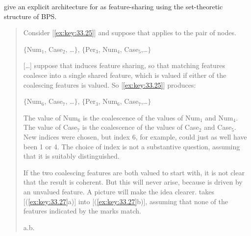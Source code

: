 \documentclass[output=paper]{langsci/langscibook}
\begin{document}
\cite{frampton2000agreement} give an explicit architecture for  as
feature-sharing using the set-theoretic structure of \gls{BPS}.

\blockquote[{\citealt{frampton2000agreement}}]{Consider [\eqref{ex:key:33.25}]
    and suppose that  applies to the pair of nodes.

{\small
\ea\label{ex:key:33.25}$\{$Num${}_1$, Case${}_2$, \ldots$\}$,
$\{$Per${}_3$, Num${}_4$, Case${}_5$,\dots$\}$
\z}

[\ldots] suppose that  induces feature sharing, so that matching features
coalesce into a single shared feature, which is valued if either of the
coalescing features is valued. So [\eqref{ex:key:33.25}] produces:

{\small
\ea\label{ex:key:33.26}$\{$Num${}_6$, Case${}_7$, \ldots$\}$,
$\{$Per${}_3$, Num${}_6$, Case${}_7$,\dots$\}$
\z}

The value of Num$_6$ is the coalescence of the values of Num$_1$ and Num$_4$.
The value of Case$_7$ is the coalescence of the values of Case$_2$ and
Case$_5$. New indices were chosen, but index 6, for example, could just as well
have been 1 or 4. The choice of index is not a substantive question, assuming
that it is suitably distinguished.

If the two coalescing features are both valued to start with, it is not clear
that the result is coherent. But this will never arise, because  is driven
by an unvalued feature. A picture will make the idea clearer.  takes
[(\ref{ex:key:33.27}a)] into [(\ref{ex:key:33.27}b)], assuming that none of the
features indicated by the  marks match.

\ea\label{ex:key:33.27} a.\hspace{6.25cm}b.
    }
\end{document}
